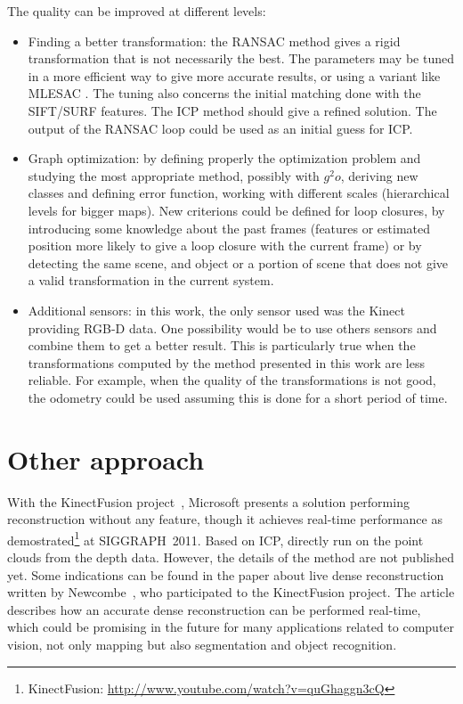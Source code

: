 The quality can be improved at different levels:
\begin{itemize}
\item Finding a better transformation: the \gls{RANSAC} method gives a rigid transformation that is not necessarily the best. The parameters may be tuned in a more efficient way to give more accurate results, or using a variant like MLESAC \cite{TorrZ00}. The tuning also concerns the initial matching done with the \gls{SIFT}/\gls{SURF} features. The \gls{ICP} \cite{zhang_92_icp} method should give a refined solution. The output of the \gls{RANSAC} loop could be used as an initial guess for \gls{ICP}. 
\item Graph optimization: by defining properly the optimization problem and studying the most appropriate method, possibly with $g^2o$, deriving new classes and defining error function, working with different scales (hierarchical levels for bigger maps). New criterions could be defined for loop closures, by introducing some knowledge about the past frames (features or estimated position more likely to give a loop closure with the current frame) or by detecting the same scene, and object or a portion of scene that does not give a valid transformation in the current system.
\item Additional sensors: in this work, the only sensor used was the Kinect providing RGB-D data. One possibility would be to use others sensors and combine them to get a better result. This is particularly true when the transformations computed by the method presented in this work are less reliable. For example, when the quality of the transformations is not good, the odometry could be used assuming this is done for a short period of time.
\end{itemize}

\section{Other approach}

With the KinectFusion project~\cite{MSFusion}, Microsoft presents a solution performing reconstruction without any feature, though it achieves real-time performance as demostrated\footnote{KinectFusion: \url{http://www.youtube.com/watch?v=quGhaggn3cQ}} at SIGGRAPH~2011. Based on \gls{ICP}, directly run on the point clouds from the depth data. However, the details of the method are not published yet. Some indications can be found in the paper about live dense reconstruction written by Newcombe~\cite{Newcombe_2010}, who participated to the KinectFusion project. The article describes how an accurate dense reconstruction can be performed real-time, which could be promising in the future for many applications related to computer vision, not only mapping but also segmentation and object recognition.

